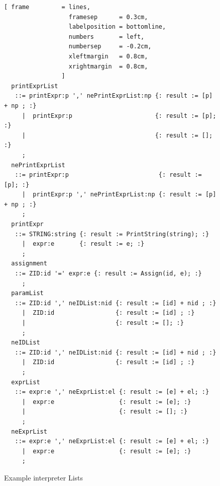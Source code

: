 \begin{figure}[!ht]

\begin{Verbatim}[ frame         = lines, 
                  framesep      = 0.3cm, 
                  labelposition = bottomline,
                  numbers       = left,
                  numbersep     = -0.2cm,
                  xleftmargin   = 0.8cm,
                  xrightmargin  = 0.8cm,
                ]
  printExprList 
   ::= printExpr:p ',' nePrintExprList:np {: result := [p] + np ; :}
     |  printExpr:p                       {: result := [p]; :}
     |                                    {: result := []; :}
     ;
  nePrintExprList
   ::= printExpr:p                         {: result := [p]; :}
     |  printExpr:p ',' nePrintExprList:np {: result := [p] + np ; :}
     ;
  printExpr 
   ::= STRING:string {: result := PrintString(string); :}
     |  expr:e       {: result := e; :}
     ;
  assignment 
   ::= ZID:id '=' expr:e {: result := Assign(id, e); :}
     ;
  paramList 
   ::= ZID:id ',' neIDList:nid {: result := [id] + nid ; :}
     |  ZID:id                 {: result := [id] ; :}
     |                         {: result := []; :}
     ;
  neIDList
   ::= ZID:id ',' neIDList:nid {: result := [id] + nid ; :}
     |  ZID:id                 {: result := [id] ; :}
     ;
  exprList
   ::= expr:e ',' neExprList:el {: result := [e] + el; :}
     |  expr:e                  {: result := [e]; :}
     |                          {: result := []; :}
     ;
  neExprList
   ::= expr:e ',' neExprList:el {: result := [e] + el; :}
     |  expr:e                  {: result := [e]; :}
     ;
		\end{Verbatim}
\caption{Example interpreter Lists}
\label{fig:example_interpreter_grammar_lists}
\end{figure}
